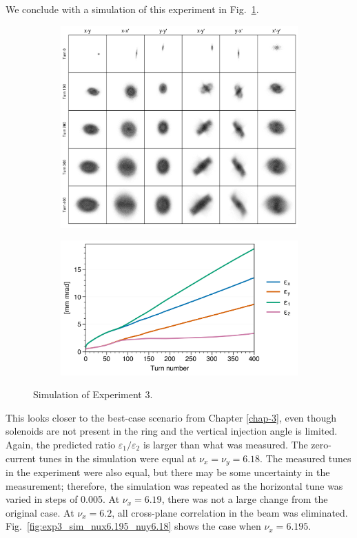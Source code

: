 We conclude with a simulation of this experiment in Fig.~\ref{fig:exp3_sim}.
%
\begin{figure}[!p]
    \centering
    \begin{subfigure}{\textwidth}
        \includegraphics[width=\textwidth]{Images/chapter5/exp3/sim_snapshots.png}
    \end{subfigure}
    \vfill
    \vspace*{1.0cm}
    \vfill
    \begin{subfigure}{0.7\textwidth}
        \includegraphics[width=\textwidth]{Images/chapter5/exp3/sim_emittances.png}
    \end{subfigure}
    \caption{Simulation of Experiment 3.}
    \label{fig:exp3_sim}
\end{figure}
%
This looks closer to the best-case scenario from Chapter \ref{chap-3}, even though solenoids are not present in the ring and the vertical injection angle is limited. Again, the predicted ratio $\varepsilon_1 / \varepsilon_2$ is larger than what was measured. The zero-current tunes in the simulation were equal at $\nu_x = \nu_y = 6.18$. The measured tunes in the experiment were also equal, but there may be some uncertainty in the measurement; therefore, the simulation was repeated as the horizontal tune was varied in steps of 0.005. At $\nu_x = 6.19$, there was not a large change from the original case. At $\nu_x = 6.2$, all cross-plane correlation in the beam was eliminated. Fig.~\ref{fig:exp3_sim_nux6.195_nuy6.18} shows the case when $\nu_x = 6.195$. 
